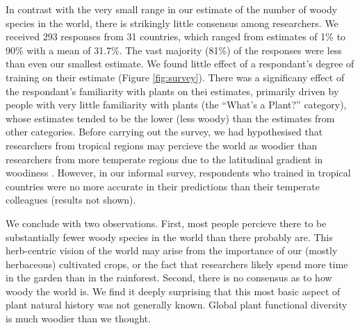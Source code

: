 \documentclass[12pt]{article}
\begin{document}
In contrast with the very small range in our estimate of the number of
woody species in the world, there is strikingly little consensus among
researchers.  We received 293 responses from 31 countries, which
ranged from estimates of 1\% to 90\% with a mean of 31.7\%.  The vast
majority (81\%) of the responses were less than even our smallest
estimate.
We found little effect of a respondant's degree of training on their
estimate (Figure \ref{fig:survey}).  There was a significany effect of
the respondant's familiarity with plants on thei estimates, primarily
driven by people with very little familiarity with plants (the
``What's a Plant?'' category), whose estimates tended to be the lower
(less woody) than the estimates from other categories.
% 
Before carrying out the survey, we had hypothesised that researchers
from tropical regions may percieve the world as woodier than
researchers from more temperate regions due to the latitudinal
gradient in woodiness \citep{Molesheihgt}.  However, in our informal
survey, respondents who trained in tropical countries were no more
accurate in their predictions than their temperate colleagues (results
not shown).

We conclude with two observations.  
%
First, most people percieve there to be substantially fewer woody
species in the world than there probably are.  This herb-centric
vision of the world may arise from the importance of our (mostly
herbaceous) cultivated crops, or the fact that researchers likely
spend more time in the garden than in the rainforest.
%
Second, there is no consensus as to how woody the world is.  We find
it deeply surprising that this most basic aspect of plant natural
history was not generally known.  Global plant functional diversity is
much woodier than we thought.



\end{document}
